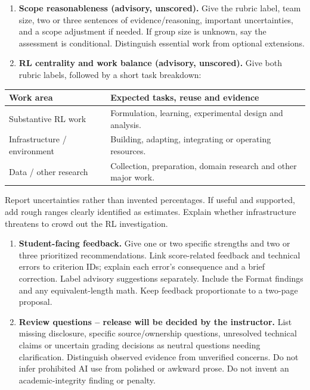 \documentclass{article}
\begin{document}
\begin{enumerate}[start=4]
\item \textbf{Scope reasonableness (advisory, unscored).} Give the rubric label, team size, two or three sentences of evidence/reasoning, important uncertainties, and a scope adjustment if needed. If group size is unknown, say the assessment is conditional. Distinguish essential work from optional extensions.
\item \textbf{RL centrality and work balance (advisory, unscored).} Give both rubric labels, followed by a short task breakdown:
\end{enumerate}
\begin{center}
\begin{tabularx}{\linewidth}{@{}p{4cm}L@{}}
\textbf{Work area} & \textbf{Expected tasks, reuse and evidence}\\\hline
Substantive RL work & Formulation, learning, experimental design and analysis.\\
Infrastructure / environment & Building, adapting, integrating or operating resources.\\
Data / other research & Collection, preparation, domain research and other major work.\\
\end{tabularx}
\end{center}
\noindent Report uncertainties rather than invented percentages. If useful and supported, add rough ranges clearly identified as estimates. Explain whether infrastructure threatens to crowd out the RL investigation.

\begin{enumerate}[start=6]
\item \textbf{Student-facing feedback.} Give one or two specific strengths and two or three prioritized recommendations. Link score-related feedback and technical errors to criterion IDs; explain each error's consequence and a brief correction. Label advisory suggestions separately. Include the Format findings and any equivalent-length math. Keep feedback proportionate to a two-page proposal.
\item \textbf{Review questions -- release will be decided by the instructor.} List missing disclosure, specific source/ownership questions, unresolved technical claims or uncertain grading decisions as neutral questions needing clarification. Distinguish observed evidence from unverified concerns. Do not infer prohibited AI use from polished or awkward prose. Do not invent an academic-integrity finding or penalty.
\end{enumerate}
\end{document}
